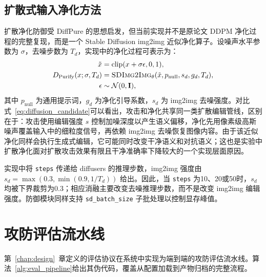 \documentclass[type=bachelor,oneside]{fduthesis}
\begin{document}
\subsection{扩散式输入净化方法}

扩散净化防御受 DiffPure\cite{nie2022diffpure} 的思想启发，但当前实现并不是原论文 DDPM 净化过程的完整复现，而是一个 Stable Diffusion img2img 近似净化算子。设噪声水平参数为 $\sigma$，去噪步数为 $T_d$，实现中的净化过程可表示为：
\begin{equation}
  \begin{aligned}
    \tilde{x} &= \operatorname{clip}(x+\sigma\epsilon,0,1),\\
    D_{\text{Purify}}(x; \sigma, T_d)
      &= \textsc{SDImg2Img}_\theta(\tilde{x},p_{\text{null}},s_d,g_d,T_d),\\
    \epsilon &\sim \mathcal{N}(0,\mathbf{I}),
  \end{aligned}
  \label{eq:defense_purify}
\end{equation}
其中 $p_{\text{null}}$ 为通用提示词，$g_d$ 为净化引导系数，$s_d$ 为 img2img 去噪强度。对比式~\eqref{eq:diffusion_candidate}可以看出，攻击和净化共享同一类扩散编辑管线，区别在于：攻击使用编辑强度 $s$ 控制加噪深度以产生语义偏移，净化先用像素级高斯噪声覆盖输入中的细粒度信号，再依赖 img2img 去噪恢复图像内容。由于该近似净化同样会执行生成式编辑，它可能同时改变干净语义和对抗语义；这也是实验中扩散净化面对扩散攻击效果有限且干净准确率下降较大的一个实现层面原因。

实现中将 \texttt{steps} 传递给 diffusers 的推理步数，img2img 强度由 $s_d=\max(0.3, \min(0.9, 1/T_d))$ 给出。因此，当 \texttt{steps} 为10、20或50时，$s_d$ 均被下界裁剪为0.3；相应消融主要改变去噪推理步数，而不是改变 img2img 编辑强度。防御模块同样支持 \texttt{sd\_batch\_size} 子批处理以控制显存峰值。

\section{攻防评估流水线}

第~\ref{chap:design}~章定义的评估协议在系统中实现为端到端的攻防评估流水线。算法~\ref{alg:eval_pipeline}给出其伪代码，覆盖从配置加载到产物归档的完整流程。
\end{document}

